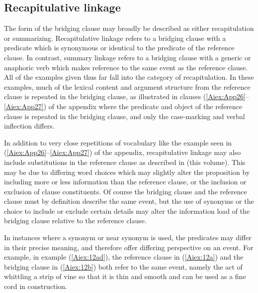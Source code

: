 \documentclass[output=paper]{LSP/langsci}
\begin{document}
\subsection{Recapitulative linkage} 
\label{AiRecapitulative}
The form of the bridging clause may broadly be described as either recapitulation or summarizing. Recapitulative linkage refers to a bridging clause with a predicate which is synonymous or identical to the predicate of the reference clause. In contrast, summary linkage refers to a bridging clause with a generic or anaphoric verb which makes reference to the same event as the reference clause. All of the examples given thus far fall into the category of recapitulation. In these examples, much of the lexical content and argument structure from the reference clause is repeated in the bridging clause, as illustrated in clauses (\ref{Aiex:App26}--\ref{Aiex:App27}) of the appendix where the predicate and object of the reference clause is repeated in the bridging clause, and only the case-marking and verbal inflection differs.

In addition to very close repetitions of vocabulary like the example seen in (\ref{Aiex:App26}--\ref{Aiex:App27}) of the appendix, recapitulative linkage may also include substitutions in the reference clause as described in \citeauthor{guerin18} (this volume). This may be due to differing word choices which may slightly alter the proposition by including more or less information than the reference clause, or the inclusion or exclusion of clause constituents. Of course the bridging clause and the reference clause must by definition describe the same event, but the use of synonyms or the choice to include or exclude certain details may alter the information load of the bridging clause relative to the reference clause.

In instances where a synonym or near synonym is used, the predicates may differ in their precise meaning, and therefore offer differing perspective on an event. For example, in example (\ref{Aiex:12ad}), the reference clause in (\ref{Aiex:12a}) and the bridging clause in (\ref{Aiex:12b}) both refer to the same event, namely the act of whittling a strip of vine so that it is thin and smooth and can be used as a fine cord in construction.
\end{document}
